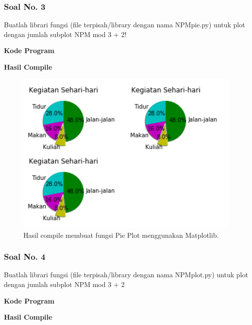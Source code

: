 \subsubsection{Soal No. 3}
\hfill \break
Buatlah librari fungsi (file terpisah/library dengan nama NPMpie.py) untuk plot dengan jumlah subplot NPM mod 3 + 2!

\hfill \break
\textbf{Kode Program}



\hfill \break
\textbf{Hasil Compile}

\begin{figure}[H]
	\includegraphics[width=12cm]{figures/6/1174042/p3.png}
	\centering
	\caption{Hasil compile membuat fungsi Pie Plot menggunakan Matplotlib.}
\end{figure}

\subsubsection{Soal No. 4}
\hfill \break
Buatlah librari fungsi (file terpisah/library dengan nama NPMplot.py) untuk plot dengan jumlah subplot NPM mod 3 + 2

\hfill \break
\textbf{Kode Program}



\hfill \break
\textbf{Hasil Compile}

